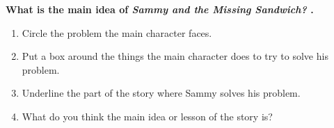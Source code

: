 \documentclass[12pt]{article}
\begin{document}
\begin{tcolorbox}[colframe=black!60, colback=white, 
coltitle=black, colbacktitle=black!15, fonttitle=\bfseries\Large, 
title=Guided Practice, halign title=center, left=10pt, right=10pt, top=10pt, bottom=15pt]
\textbf{What is the main idea of \textit{Sammy and the Missing Sandwich?} .} 
\vspace{1em}
\begin{enumerate}[itemsep=1em] %
    \item Circle the problem the main character faces.
    \item Put a box around the things the main character does to try to solve his problem.
    \item Underline the part of the story where Sammy solves his problem.
    \item What do you think the main idea or lesson of the story is?
\\[0.8cm] \underline{\hspace{15cm}}  
    \\[0.8cm] \underline{\hspace{15cm}}  
   




\end{enumerate}

\end{tcolorbox}

\vspace{.5em}
\end{document}
